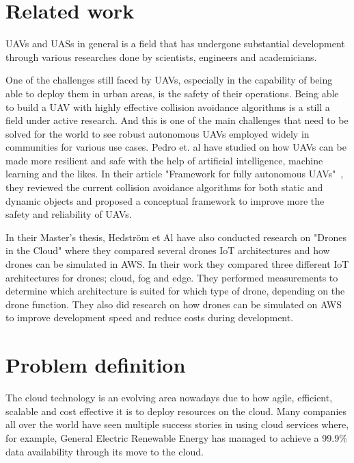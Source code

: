 
\section{Related work}
\label{sec:related-work}

UAVs and UASs in general is a field that has undergone substantial development through various researches done by scientists, engineers and academicians.

One of the challenges still faced by UAVs, especially in the capability of being able to deploy them in urban areas, is the safety of their operations. Being able to build a UAV with highly effective collision avoidance algorithms is a still a field under active research. And this is one of the main challenges that need to be solved for the world to see robust autonomous UAVs employed widely in communities for various use cases. Pedro et. al have studied on how UAVs can be made more resilient and safe with the help of artificial intelligence, machine learning and the likes. In their article "Framework for fully autonomous UAVs"~\cite{Pedro2020}, they reviewed the current collision avoidance algorithms for both static and dynamic objects and proposed a conceptual framework to improve more the safety and reliability of UAVs.

In their Master's thesis, Hedström et Al have also conducted research on "Drones in the Cloud" where they compared several drones IoT architectures and how drones can be simulated in AWS\cite{mscdronesinthecloud}. In their work they compared three different IoT architectures for drones; cloud, fog and edge. They performed measurements to determine which architecture is suited for which type of drone, depending on the drone function. They also did research on how drones can be simulated on AWS to improve development speed and reduce costs during development.




\section{Problem definition}
\label{sec:problem-definition}
The cloud technology is an evolving area nowadays due to how agile, efficient, scalable and cost effective it is to deploy resources on the cloud. Many companies all over the world have seen multiple success stories in using cloud services where, for example, General Electric Renewable Energy has managed to achieve a 99.9\% data availability through its move to the cloud\cite{awsgerenewableenergy}.

